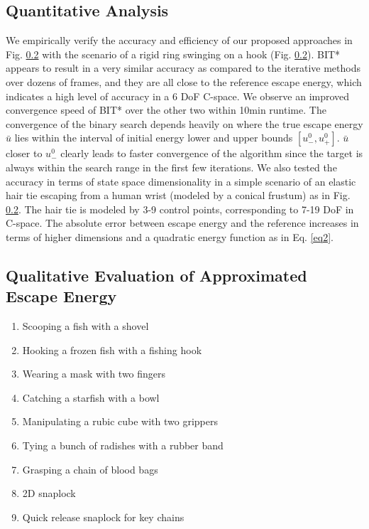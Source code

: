\documentclass[conference]{IEEEtran}
\begin{document}
\subsection{Quantitative Analysis}
We empirically verify the accuracy and efficiency of our proposed approaches in Fig. \ref{} with the scenario of a rigid ring swinging on a hook (Fig. \ref{}).
BIT* appears to result in a very similar accuracy as compared to the iterative methods over dozens of frames, and they are all close to the reference escape energy, which indicates a high level of accuracy in a 6 DoF C-space.
We observe an improved convergence speed of BIT* over the other two within 10min runtime.
The convergence of the binary search depends heavily on where the true escape energy $\bar{u}$ lies within the interval of initial energy lower and upper bounds $[u_-^0,u_+^0]$.
$\bar{u}$ closer to $u_-^0$ clearly leads to faster convergence of the algorithm since the target is always within the search range in the first few iterations.
We also tested the accuracy in terms of state space dimensionality in a simple scenario of an elastic hair tie escaping from a human wrist (modeled by a conical frustum) as in Fig. \ref{}.
The hair tie is modeled by 3-9 control points, corresponding to 7-19 DoF in C-space.
The absolute error between escape energy and the reference increases in terms of higher dimensions and a quadratic energy function as in Eq. \ref{eq2}. 
\subsection{Qualitative Evaluation of Approximated Escape Energy}

\begin{enumerate}
	\item Scooping a fish with a shovel
	\item Hooking a frozen fish with a fishing hook
	\item Wearing a mask with two fingers
	\item Catching a starfish with a bowl
	\item Manipulating a rubic cube with two grippers
	\item Tying a bunch of radishes with a rubber band
	\item Grasping a chain of blood bags
	\item 2D snaplock
	\item Quick release snaplock for key chains
\end{enumerate}
\end{document}
